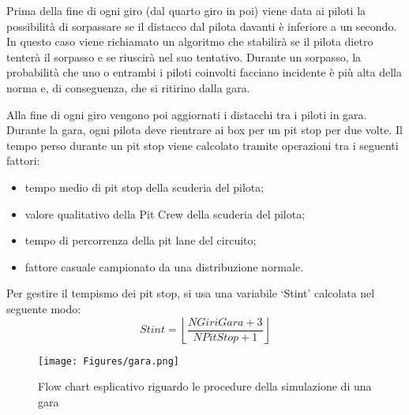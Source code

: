 Prima della fine di ogni giro (dal quarto giro in poi) viene data ai piloti la possibilità di sorpassare se il distacco dal pilota davanti è inferiore a un secondo. In questo caso viene richiamato un algoritmo che stabilirà se il pilota dietro tenterà il sorpasso e se riuscirà nel suo tentativo. Durante un sorpasso, la probabilità che uno o entrambi i piloti coinvolti facciano incidente è più alta della norma e, di conseguenza, che si ritirino dalla gara.

Alla fine di ogni giro vengono poi aggiornati i distacchi tra i piloti in gara. Durante la gara, ogni pilota deve rientrare ai box per un pit stop per due volte. Il tempo perso durante un pit stop viene calcolato tramite operazioni tra i seguenti fattori:
\begin{itemize}
    \item tempo medio di pit stop della scuderia del pilota;
    \item valore qualitativo della Pit Crew della scuderia del pilota;
    \item tempo di percorrenza della pit lane del circuito;
    \item fattore casuale campionato da una distribuzione normale.
\end{itemize}

Per gestire il tempismo dei pit stop, si usa una variabile ‘Stint’ calcolata nel seguente modo:
\[ Stint = \left\lfloor \frac{NGiriGara + 3}{NPitStop + 1} \right\rfloor \]


\begin{figure}[H]
    \centering
    \texttt{[image: Figures/gara.png]}
    \caption{Flow chart esplicativo riguardo le procedure della simulazione di una gara}
    \label{fig:flowchart_simulatore_gara}
\end{figure}

